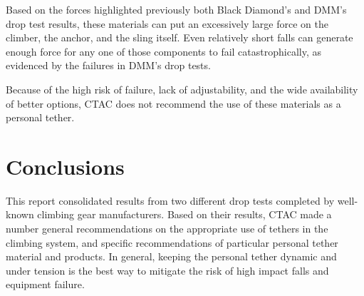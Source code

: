 \documentclass[nonacm,acmtog]{acmart}
\begin{document}
   Based on the forces highlighted previously both Black Diamond's and DMM's
   drop test results, these materials can put an excessively large force on the
   climber, the anchor, and the sling itself.  Even relatively short falls can
   generate enough force for any one of those components to fail
   catastrophically, as evidenced by the failures in DMM's drop tests.

   Because of the high risk of failure, lack of adjustability, and the wide
   availability of better options, CTAC does not recommend the use of these
   materials as a personal tether.

\section{Conclusions}
\label{sec:conclusions}

   This report consolidated results from two different drop tests completed by
   well-known climbing gear manufacturers.  Based on their results, CTAC made a
   number general recommendations on the appropriate use of tethers in the
   climbing system, and specific recommendations of particular personal tether
   material and products.  In general, keeping the personal tether dynamic and
   under tension is the best way to mitigate the risk of high impact falls and
   equipment failure.



\end{document}

